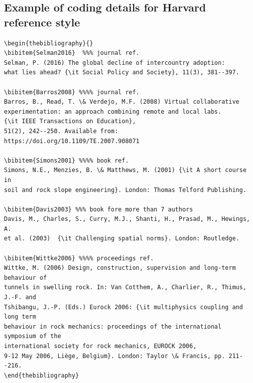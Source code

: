\documentclass[11pt]{article}
\begin{document}
\enlargethispage{18pt}

\vspace*{-12pt}
\subsection{Example of coding details for Harvard reference style}
\begin{verbatim}
\begin{thebibliography}{}
\bibitem{Selman2016}  %%% journal ref.
Selman, P. (2016) The global decline of intercountry adoption:
what lies ahead? {\it Social Policy and Society}, 11(3), 381--397.

\bibitem{Barros2008} %%%% journal ref.
Barros, B., Read, T. \& Verdejo, M.F. (2008) Virtual collaborative
experimentation: an approach combining remote and local labs.
{\it IEEE Transactions on Education},
51(2), 242--250. Available from: https://doi.org/10.1109/TE.2007.908071

\bibitem{Simons2001} %%%% book ref.
Simons, N.E., Menzies, B. \& Matthews, M. (2001) {\it A short course in
soil and rock slope engineering}. London: Thomas Telford Publishing.

\bibitem{Davis2003} %%% book fore more than 7 authors
Davis, M., Charles, S., Curry, M.J., Shanti, H., Prasad, M., Hewings, A.
et al. (2003)  {\it Challenging spatial norms}. London: Routledge.

\bibitem{Wittke2006} %%%% proceedings ref.
Wittke, M. (2006) Design, construction, supervision and long-term behaviour of
tunnels in swelling rock. In: Van Cotthem, A., Charlier, R., Thimus, J.-F. and
Tshibangu, J.-P. (Eds.) Eurock 2006: {\it multiphysics coupling and long term
behaviour in rock mechanics: proceedings of the international symposium of the
international society for rock mechanics, EUROCK 2006,
9-12 May 2006, Liège, Belgium}. London: Taylor \& Francis, pp. 211--216.
\end{thebibliography}
\end{verbatim}
\end{document}
